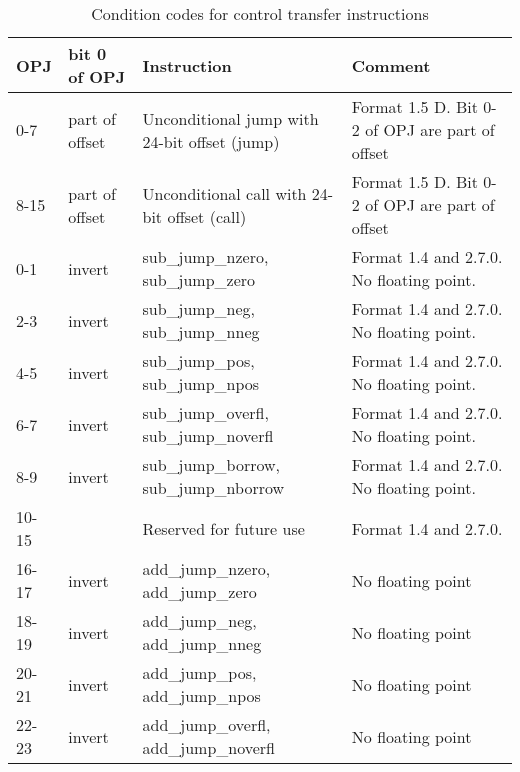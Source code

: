 \documentclass[forwardcom.tex]{subfiles}
\begin{document}
\begin{longtable}
{|p{10mm}|p{14mm}|p{50mm}|p{50mm}|}
\caption{Condition codes for control transfer instructions}
\label{table:controlTransferInstructions}
\endfirsthead
\endhead
\hline
OPJ & bit 0 \newline of OPJ & Instruction & Comment \\
\hline
0-7 & part of offset & Unconditional jump with 24-bit offset (jump) & Format 1.5 D. Bit 0-2 of OPJ are part of offset \\
\hline
8-15 & part of offset & Unconditional call with 24-bit offset (call) & Format 1.5 D.  Bit 0-2 of OPJ are part of offset \\
\hline
0-1 & invert & sub\_jump\_nzero, \newline sub\_jump\_zero & Format 1.4 and 2.7.0. \newline No floating point. \\
\hline
2-3 & invert & sub\_jump\_neg, \newline sub\_jump\_nneg & Format 1.4 and 2.7.0. \newline No floating point. \\
\hline
4-5 & invert & sub\_jump\_pos, \newline sub\_jump\_npos & Format 1.4 and 2.7.0. \newline 
    No floating point. \\
\hline
6-7 & invert & sub\_jump\_overfl, \newline sub\_jump\_noverfl & Format 1.4 and 2.7.0. \newline No floating point. \\
\hline
8-9 & invert & sub\_jump\_borrow, \newline sub\_jump\_nborrow & Format 1.4 and 2.7.0. \newline No floating point. \\
\hline
10-15 & & Reserved for future use & Format 1.4 and 2.7.0. \\
\hline
16-17 & invert & add\_jump\_nzero, \newline add\_jump\_zero & No floating point \\
\hline
18-19 & invert & add\_jump\_neg, \newline add\_jump\_nneg & No floating point \\
\hline
20-21 & invert & add\_jump\_pos, \newline add\_jump\_npos & No floating point \\
\hline
22-23 & invert & add\_jump\_overfl, \newline add\_jump\_noverfl & No floating point  \\

\end{longtable}
\end{document}
